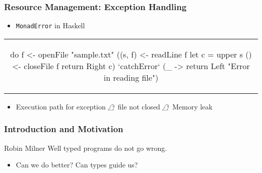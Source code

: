 \begin{frame}[fragile]
  \frametitle{Resource Management: Exception Handling}
  \begin{center}

  \begin{itemize}
  \item \texttt{MonadError} in Haskell
  \end{itemize}
  \begin{tabular}[h]{c}
    \begin{haskell}
      do f <- openFile "sample.txt"
         ((s, f)  <- readLine f
         let c = upper s
         () <- closeFile f
         return \dollar Right c) `catchError` (\_ ->
                             return \dollar Left "Error in reading file")
     \end{haskell}
  \end{tabular}
  \begin{itemize}
  \item Execution path for exception $\mathrightghost$ file not closed $\mathrightghost$ Memory leak
  \end{itemize}
  \end{center}
\end{frame}

\begin{frame}
  \frametitle{Introduction and Motivation}
  \begin{aquote}{Robin Milner}
      Well typed programs do not go wrong.
  \end{aquote}

    \begin{itemize}
    \item<2-> Can we do better? Can types guide us?
  \end{itemize}
\end{frame}
